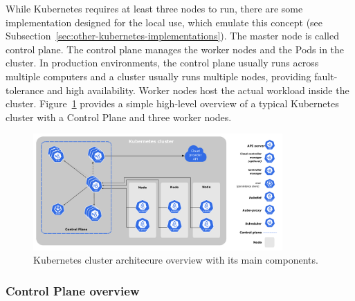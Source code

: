 While Kubernetes requires at least three nodes to run, there are some implementation designed for the local use, which emulate this concept (see Subsection~\ref{sec:other-kubernetes-implementations}). The master node is called control plane. The control plane manages the worker nodes and the Pods in the cluster. In production environments, the control plane usually runs across multiple computers and a cluster usually runs multiple nodes, providing fault-tolerance and high availability. Worker nodes host the actual workload inside the cluster. Figure~\ref{img:kubernetes-architecture} provides a simple high-level overview of a typical Kubernetes cluster with a Control Plane and three worker nodes.

\begin{figure}[!hbt]
	\begin{center}
		\includegraphics[width=0.85\textwidth]{images/components-of-kubernetes.pdf}
        \caption{Kubernetes cluster architecure overview with its main components.}
		\label{img:kubernetes-architecture}
	\end{center}
\end{figure}

\subsubsection*{Control Plane overview}

